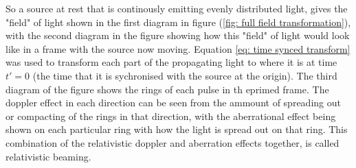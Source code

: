 So a source at rest that is continously emitting evenly distributed light, gives the "field" of light shown in the first diagram in figure (\ref{fig: full field transformation}), with the second diagram in the figure showing how this "field" of light would look like in a frame with the source now moving.
Equation \eqref{eq: time synced transform} was used to transform each part of the propagating light to where it is at time $t'=0$ (the time that it is sychronised with the source at the origin).
The third diagram of the figure shows the rings of each pulse in th eprimed frame.
The doppler effect in each direction can be seen from the ammount of spreading out or compacting of the rings in that direction, with the aberrational effect being shown on each particular ring with how the light is spread out on that ring.
This combination of the relativistic doppler and aberration effects together, is called relativistic beaming.


